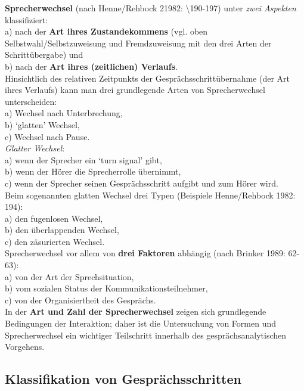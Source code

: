 \documentclass[
  letterpaper,
]{scrbook}
\begin{document}
\textbf{Sprecherwechsel} (nach Henne/Rehbock 21982:
\textbackslash190-197) unter \emph{zwei Aspekten} klassifiziert:\\
a) nach der \textbf{Art ihres Zustandekommens} (vgl. oben
Selbstwahl/Selbstzuweisung und Fremdzuweisung mit den drei Arten der
Schrittübergabe) und\\
b) nach der \textbf{Art ihres (zeitlichen) Verlaufs}.\\
Hinsichtlich des relativen Zeitpunkts der Gesprächsschrittübernahme (der
Art ihres Verlaufs) kann man drei grundlegende Arten von Sprecherwechsel
unterscheiden:\\
a) Wechsel nach Unterbrechung,\\
b) `glatten' Wechsel,\\
c) Wechsel nach Pause.\\

\emph{Glatter Wechsel}:\\
a) wenn der Sprecher ein `turn signal' gibt,\\
b) wenn der Hörer die Sprecherrolle übernimmt,\\
c) wenn der Sprecher seinen Gesprächsschritt aufgibt und zum Hörer
wird.\\

Beim sogenannten glatten Wechsel drei Typen (Beispiele Henne/Rehbock
1982: 194):\\
a) den fugenlosen Wechsel,\\
b) den überlappenden Wechsel,\\
c) den zäsurierten Wechsel.\\

Sprecherwechsel vor allem von \textbf{drei Faktoren} abhängig (nach
Brinker 1989: 62-63):\\
a) von der Art der Sprechsituation,\\
b) vom sozialen Status der Kommunikationsteilnehmer,\\
c) von der Organisiertheit des Gesprächs.\\

In der \textbf{Art und Zahl der Sprecherwechsel} zeigen sich
grundlegende Bedingungen der Interaktion; daher ist die Untersuchung von
Formen und Sprecherwechsel ein wichtiger Teilschritt innerhalb des
gesprächsanalytischen Vorgehens.

\hypertarget{klassifikation-von-gespruxe4chsschritten}{%
\subsection{Klassifikation von
Gesprächsschritten}\label{klassifikation-von-gespruxe4chsschritten}}
\end{document}
